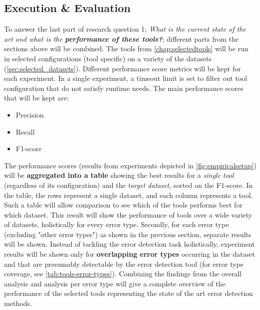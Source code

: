 \subsection{Execution \& Evaluation}
To answer the last part of research question 1; \textit{What is the current state of the art and what is the \textbf{performance of these tools?}}; different parts from the sections above will be combined. The tools from \autoref{chap:selectedtools} will be run in selected configurations (tool specific) on a variety of the datasets (\autoref{sec:selected_datasets}). Different performance score metrics will be kept for each experiment. In a single experiment, a timeout limit is set to filter out tool configuration that do not satisfy runtime needs. The main performance scores that will be kept are:
\begin{itemize}
    \item Precision
    \item Recall
    \item F1-score
\end{itemize}

The performance scores (results from experiments depicted in \autoref{fig:empiricalsetup}) will be \textbf{aggregated into a table} showing the best results for a \textit{single tool} (regardless of its configuration) and the \textit{target dataset}, sorted on the F1-score. In the table, the rows represent a single dataset, and each column represents a tool. Such a table will allow comparison to see which of the tools performs best for which dataset. This result will show the performance of tools over a wide variety of datasets, holistically for every error type.
Secondly, for each error type (excluding "other error types") as shown in the previous section, separate results will be shown. Instead of tackling the error detection task holistically, experiment results will be shown only for \textbf{overlapping error types} occurring in the dataset and that are presumably detectable by the error detection tool (for error type coverage, see \autoref{tab:tools-error-types}).
Combining the findings from the overall analysis and analysis per error type will give a complete overview of the performance of the selected tools representing the state of the art error detection methods. 


